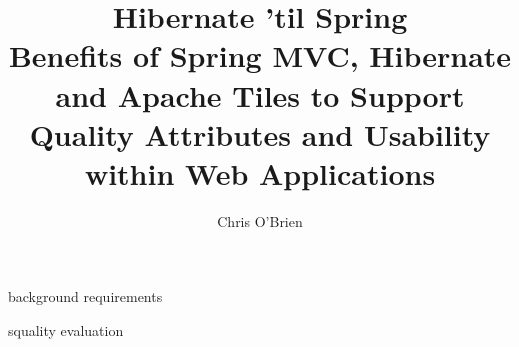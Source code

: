 \documentclass[a4paper,11pt,fleqn]{report}
\begin{document}
\title{Hibernate 'til Spring \\ Benefits of Spring MVC, Hibernate and Apache Tiles to Support Quality Attributes and Usability within Web Applications}
\author{Chris O'Brien}
\maketitle

\begin{abstract}      

\end{abstract}        

%
%
\tableofcontents

%
%
\listoffigures

%
%
\listoftables


 {background}
 {requirements}


 {squality}
 {evaluation}

\printbibliography
\appendix

\end{document}
